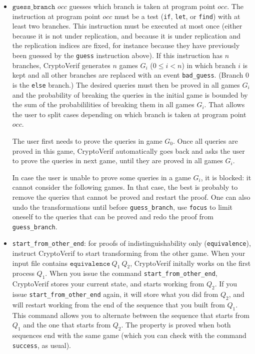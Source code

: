 \documentclass{article}
\begin{document}
\begin{itemize}
\item $\texttt{guess\_branch }occ$ guesses which branch is taken at
  program point $occ$. The instruction at program point $occ$ must be
  a test (\texttt{if}, \texttt{let}, or \texttt{find}) with at least two
  branches. This instruction must be executed at most once (either because
  it is not under replication, and because it is under replication and the
  replication indices are fixed, for instance because they have previously
  been guessed by the \texttt{guess} instruction above).
  If this instruction has $n$ branches, CryptoVerif generates $n$ games $G_i$ ($0 \leq i < n$) in which branch $i$ is kept and all other branches are replaced with an event \texttt{bad\_guess}. (Branch 0 is the \texttt{else} branch.) The desired queries must then be proved in all games $G_i$ and the probability of breaking the queries in the initial game is bounded by the sum of the probabililities of breaking them in all games $G_i$.
  That allows the user to split cases depending on which branch is taken at program point $occ$.

  The user first needs to prove the queries in game $G_0$. Once all queries are proved in this game, CryptoVerif automatically goes back and asks the user to prove the queries in next game, until they are proved in all games $G_i$.

  In case the user is unable to prove some queries in a game $G_i$, it is blocked: it cannot consider the following games. In that case, the best is probably to remove the queries that cannot be proved and restart the proof. One can also undo the transformations until before \texttt{guess\_branch}, use \texttt{focus} to limit oneself to the queries that can be proved and redo the proof from \texttt{guess\_branch}.

\item \texttt{start\_from\_other\_end}: for proofs of indistinguishability
  only (\texttt{equivalence}), instruct CryptoVerif to start transforming
  from the other game. When your input file contains
  $\texttt{equivalence}\ Q_1\ Q_2$, CryptoVerif initally works on the first  
  process $Q_1$. When you issue the command \texttt{start\_from\_other\_end},
  CryptoVerif stores your current state, and starts working from $Q_2$.
  If you issue \texttt{start\_from\_other\_end} again, it will store
  what you did from $Q_2$, and will restart working from the end of the
  sequence that you built from $Q_1$. This command allows you to
  alternate between the sequence that starts from $Q_1$ and the one that
  starts from $Q_2$. The property is proved when both sequences end with the
  same game (which you can check with the command \texttt{success}, as usual).
  

\end{itemize}
\end{document}
